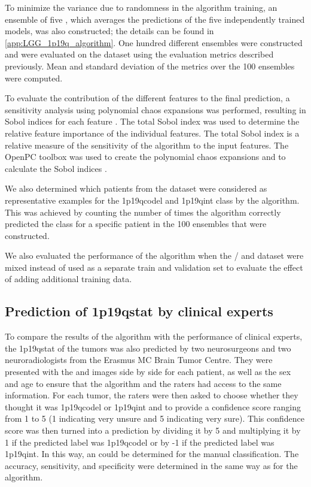 To minimize the variance due to randomness in the algorithm training, an ensemble of five , which averages the predictions of the five independently trained models, was also constructed; the details can be found in \cref{app:LGG_1p19q_algorithm}.
One hundred different ensembles were constructed and were evaluated on the  dataset using the evaluation metrics described previously.
Mean and standard deviation of the metrics over the 100 ensembles were computed.

To evaluate the contribution of the different features to the final prediction, a sensitivity analysis using polynomial chaos expansions was performed, resulting in Sobol indices for each feature \autocite{sudret2008global}.
The total Sobol index was used to determine the relative feature importance of the individual features.
The total Sobol index is a relative measure of the sensitivity of the algorithm to the input features.
The OpenPC toolbox was used to create the polynomial chaos expansions and to calculate the Sobol indices \autocite{perko2016fast, van2016robustness}.

We also determined which patients from the  dataset were considered as representative examples for the \acl{1p19qcodel} and \acl{1p19qint} class by the algorithm.
This was achieved by counting the number of times the algorithm correctly predicted the class for a specific patient in the 100 ensembles that were constructed.

We also evaluated the performance of the algorithm when the / and  dataset were mixed instead of used as a separate train and validation set to evaluate the effect of adding additional training data.
\subsection{Prediction of \acl{1p19qstat} by clinical experts}

To compare the results of the algorithm with the performance of clinical experts, the \acl{1p19qstat} of the  \glspl{tumor} was also predicted by two neurosurgeons and two neuroradiologists from the Erasmus MC Brain Tumor Centre.
They were presented with the  and  images side by side for each patient, as well as the sex and age to ensure that the algorithm and the raters had access to the same information.
For each \gls{tumor}, the raters were then asked to choose whether they thought it was \acl{1p19qcodel} or \acl{1p19qint} and to provide a confidence score ranging from 1 to 5 (1 indicating very unsure and 5 indicating very sure).
This confidence score was then turned into a prediction  by dividing it by 5 and multiplying it by 1 if the predicted label was \acl{1p19qcodel} or by -1 if the predicted label was \acl{1p19qint}.
In this way, an  could be determined for the manual classification.
The accuracy, sensitivity, and specificity were determined in the same way as for the algorithm.

